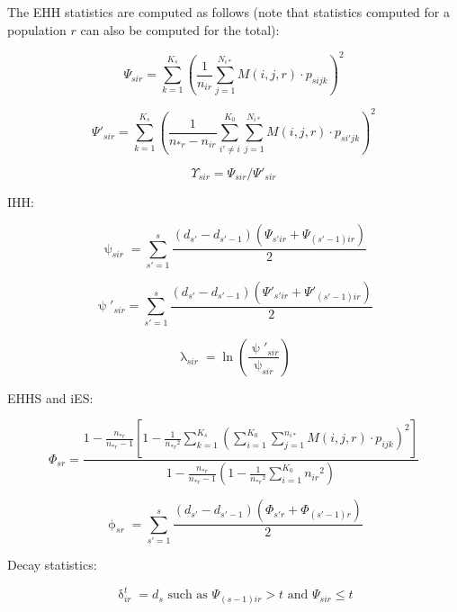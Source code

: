 \documentclass{scrartcl}
\begin{document}
The EHH statistics are computed as follows (note that statistics
computed for a population $r$ can also be computed for the total):

\begin{displaymath}
    \Psi_{sir} = \sum_{k=1}^{K_s}\left(\frac{1}{n_{ir}}\sum_{j=1}^{N_{i*}}{M(i,j,r) \cdot p_{sijk}}\right)^2
\end{displaymath}

\begin{displaymath}
    \Psi'_{sir} = \sum_{k=1}^{K_s}\left(\frac{1}{n_{*r} - n_{ir}}\sum_{i' \neq i}^{K_0}\sum_{j=1}^{N_{i*}}{M(i,j,r) \cdot p_{si'jk}}\right)^2
\end{displaymath}

\begin{displaymath}
    \Upsilon_{sir} = \Psi_{sir} / \Psi'_{sir}
\end{displaymath}

IHH:

\begin{displaymath}
    \uppsi_{sir} = \sum_{s'=1}^s \frac{(d_{s'}-d_{s'-1}) (\Psi_{s'ir} + \Psi_{(s'-1)ir})}{2}
\end{displaymath}

\begin{displaymath}
    \uppsi'_{sir} = \sum_{s'=1}^s \frac{(d_{s'}-d_{s'-1})(\Psi'_{s'ir} + \Psi'_{(s'-1)ir})}{2}
\end{displaymath}

\begin{displaymath}
    \uplambda_{sir} = \ln \left( \frac{\uppsi'_{sir}}{\uppsi_{sir}} \right)
\end{displaymath}

EHHS and iES:

\begin{displaymath}
    \Phi_{sr} = \frac
        { 1 - \frac{n_{*r}}{n_{*r}-1} \left[ 1 - \frac{1}{{n_{*r}}^2} \sum_{k=1}^{K_s}{\left(\sum_{i=1}^{K_0}\sum_{j=1}^{n_{i*}}M(i,j,r) \cdot p_{ijk} \right)^2 } \right] }
        { 1 - \frac{n_{*r}}{n_{*r}-1} \left( 1 - \frac{1}{{n_{*r}}^2} \sum_{i=1}^{K_0}{n_{ir}}^2 \right) }
\end{displaymath}

\begin{displaymath}
    \upphi_{sr} = \sum_{s'=1}^s \frac{(d_{s'}-d_{s'-1}) (\Phi_{s'r} + \Phi_{(s'-1)r})}{2}
\end{displaymath}

Decay statistics:

\begin{displaymath}
    \updelta^t_{ir} = d_s \text{ such as } \Psi_{(s-1)ir} > t \text{ and } \Psi_{sir} \leq t
\end{displaymath}
\end{document}
